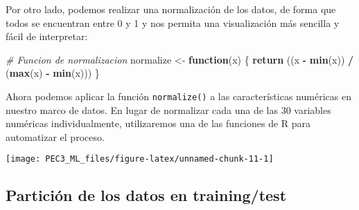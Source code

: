 \documentclass[
]{article}
\newenvironment{Shaded}{\begin{snugshade}}{\end{snugshade}}
\newcommand{\CommentTok}[1]{\textcolor[rgb]{0.56,0.35,0.01}{\textit{#1}}}
\newcommand{\ControlFlowTok}[1]{\textcolor[rgb]{0.13,0.29,0.53}{\textbf{#1}}}
\newcommand{\DataTypeTok}[1]{\textcolor[rgb]{0.13,0.29,0.53}{#1}}
\newcommand{\DecValTok}[1]{\textcolor[rgb]{0.00,0.00,0.81}{#1}}
\newcommand{\FloatTok}[1]{\textcolor[rgb]{0.00,0.00,0.81}{#1}}
\newcommand{\KeywordTok}[1]{\textcolor[rgb]{0.13,0.29,0.53}{\textbf{#1}}}
\newcommand{\NormalTok}[1]{#1}
\newcommand{\OperatorTok}[1]{\textcolor[rgb]{0.81,0.36,0.00}{\textbf{#1}}}
\newcommand{\StringTok}[1]{\textcolor[rgb]{0.31,0.60,0.02}{#1}}
\begin{document}
Por otro lado, podemos realizar una normalización de los datos, de forma
que todos se encuentran entre 0 y 1 y nos permita una visualización más
sencilla y fácil de interpretar:

\begin{Shaded}
\begin{Highlighting}[]
\CommentTok{# Funcion de normalizacion}
\NormalTok{normalize <-}\StringTok{ }\ControlFlowTok{function}\NormalTok{(x) \{}
  \KeywordTok{return}\NormalTok{ ((x }\OperatorTok{-}\StringTok{ }\KeywordTok{min}\NormalTok{(x)) }\OperatorTok{/}\StringTok{ }\NormalTok{(}\KeywordTok{max}\NormalTok{(x) }\OperatorTok{-}\StringTok{ }\KeywordTok{min}\NormalTok{(x)))}
\NormalTok{\}}
\end{Highlighting}
\end{Shaded}

Ahora podemos aplicar la función \texttt{normalize()} a las
características numéricas en nuestro marco de datos. En lugar de
normalizar cada una de las 30 variables numéricas individualmente,
utilizaremos una de las funciones de R para automatizar el proceso.

\begin{Shaded}
\end{Shaded}

\begin{center}\texttt{[image: PEC3\_ML\_files/figure-latex/unnamed-chunk-11-1]} \end{center}

\hypertarget{particiuxf3n-de-los-datos-en-trainingtest}{%
\subsection{Partición de los datos en
training/test}\label{particiuxf3n-de-los-datos-en-trainingtest}}
\end{document}
